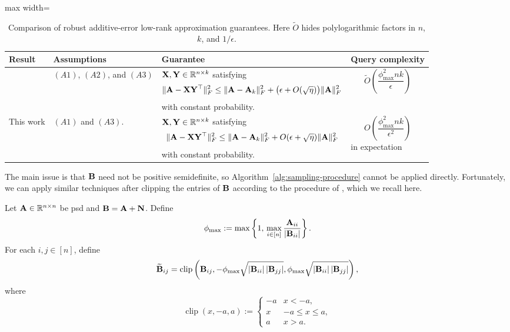 \begin{table}[H]
\centering
\small
\renewcommand{\arraystretch}{1.25}
\begin{adjustbox}{max width=\textwidth}
\begin{tabular}{@{}p{}p{}p{}>{\centering\arraybackslash}p{}@{}}
\toprule
Result
&
Assumptions
&
Guarantee
&
Query complexity

\\
\midrule
\cite{bakshi_robust_2020}
&
\((A1)\), \((A2)\), and \((A3)\)
&
\(\mathbf{X},\mathbf{Y}\in\mathbb{R}^{n\times k}\) satisfying
\[
    \|\mathbf{A}-\mathbf{X}\mathbf{Y}^\top\|_F^2
    \leq
    \|\mathbf{A}-\mathbf{A}_k\|_F^2
    +
    \bigl(\epsilon+O(\sqrt{\eta})\bigr)\|\mathbf{A}\|_F^2
\]
with constant probability.
&
\[
    \widetilde O\!\left(
        \frac{\phi_{\max}^2 n k}{\epsilon}
    \right)
\]

\\
\midrule
This work
&
\((A1)\) and \((A3)\).
&
\(\mathbf{X},\mathbf{Y}\in\mathbb{R}^{n\times k}\) satisfying
\[
    \|\mathbf{A}-\mathbf{X}\mathbf{Y}^\top\|_F^2
    \leq
    \|\mathbf{A}-\mathbf{A}_k\|_F^2
    +
    O(\epsilon+\sqrt{\eta})\|\mathbf{A}\|_F^2 
\]
with constant probability.
&
\[
    O\!\left(
        \frac{\phi_{\max}^2 n k}{\epsilon^2}
    \right)
\]
in expectation

\\
\bottomrule
\end{tabular}
\end{adjustbox}
\caption{Comparison of robust additive-error low-rank approximation guarantees.
Here \(\widetilde O\) hides polylogarithmic factors in \(n\), \(k\), and
\(1/\epsilon\).}
\label{tab:robust-lra-comparison}
\end{table}

The main issue is that \(\mathbf{B}\) need not be positive semidefinite, so Algorithm~\ref{alg:sampling-procedure} cannot be applied directly. Fortunately, we can apply similar techniques after clipping the entries of $\mathbf{B}$ according to the procedure of \cite{bakshi_robust_2020}, which we recall here.
\begin{definition}
\label{def:clipped-matrix}
    Let $\mathbf{A}\in\mathbb{R}^{n\times n}$ be psd and $\mathbf{B} = \mathbf{A} + \mathbf{N}$. Define
    \[
    \phi_{\max}
    :=
    \max\left\{1,\, \max_{i\in[n]} \frac{\mathbf{A}_{ii}}{|\mathbf{B}_{ii}|}\right\}.
    \]
    For each \(i,j\in[n]\), define
\[
    \widetilde{\mathbf{B}}_{ij}
    =
    \operatorname{clip}\left(
        \mathbf{B}_{ij},
        -\phi_{\max}\sqrt{|\mathbf{B}_{ii}|\,|\mathbf{B}_{jj}|},
        \phi_{\max}\sqrt{|\mathbf{B}_{ii}|\,|\mathbf{B}_{jj}|}
    \right),
\]
where
\[
    \operatorname{clip}(x,-a,a)
    :=
    \begin{cases}
        -a & x < -a,\\
        x & -a \leq x \leq a,\\
        a & x > a.
    \end{cases}
\]
\end{definition}

